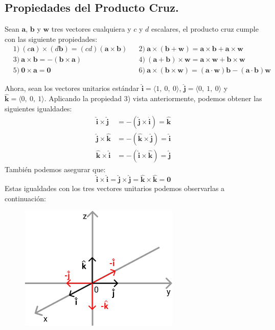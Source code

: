 \documentclass[12pt]{article}
\begin{document}
\subsection{Propiedades del Producto Cruz.}

Sean $\mathbf{a}$, $\mathbf{b}$ y $\mathbf{w}$ tres vectores cualquiera y $c$ y $d$ escalares, el producto cruz cumple con las siguiente propiedades:
\begin{align*}
&1) \ (c\mathbf{a}) \times (d\mathbf{b}) = (cd) (\mathbf{a} \times \mathbf{b}) &
&2) \ \mathbf{a} \times (\mathbf{b} + \mathbf{w}) = \mathbf{a} \times \mathbf{b} + \mathbf{a} \times \mathbf{w} \\
&3) \ \mathbf{a} \times \mathbf{b} = -(\mathbf{b} \times \mathbf{a}) &
&4) \ (\mathbf{a} + \mathbf{b}) \times \mathbf{w} = \mathbf{a} \times \mathbf{w} + \mathbf{b} \times \mathbf{w} \\
&5) \ \mathbf{0} \times \mathbf{a} = \mathbf{0} &
&6) \ \mathbf{a} \times (\mathbf{b} \times \mathbf{w}) = (\mathbf{a} \cdot \mathbf{w})\mathbf{b} - (\mathbf{a} \cdot \mathbf{b}) \mathbf{w}
\end{align*}

Ahora, sean los vectores unitarios estándar $\hat{\mathbf{i}} = \langle 1, \ 0, \ 0 \rangle$, $\hat{\mathbf{j}} = \langle 0, \ 1, \ 0 \rangle$ y $\hat{\mathbf{k}} = \langle 0, \ 0, \ 1 \rangle$. Aplicando la propiedad 3) vista anteriormente, podemos obtener las siguientes igualdades:
\begin{align*}
  \hat{\mathbf{i}} \times \hat{\mathbf{j}} &= -(\hat{\mathbf{j}} \times \hat{\mathbf{i}}) = \hat{\mathbf{k}} \\
  \hat{\mathbf{j}} \times \hat{\mathbf{k}} &= -(\hat{\mathbf{k}} \times \hat{\mathbf{j}}) = \hat{\mathbf{i}} \\
  \hat{\mathbf{k}} \times \hat{\mathbf{i}} &= -(\hat{\mathbf{i}} \times \hat{\mathbf{k}}) = \hat{\mathbf{j}}
\end{align*}
También podemos asegurar que:
\[
  \hat{\mathbf{i}} \times \hat{\mathbf{i}} = \hat{\mathbf{j}} \times \hat{\mathbf{j}} = \hat{\mathbf{k}} \times \hat{\mathbf{k}} = \mathbf{0}
\]
Estas igualdades con los tres vectores unitarios podemos observarlas a continuación:

\begin{figure}[hbt!]
\centering
\includegraphics[scale=0.6]{img/cross-product-3.jpg}
\end{figure}
\end{document}

